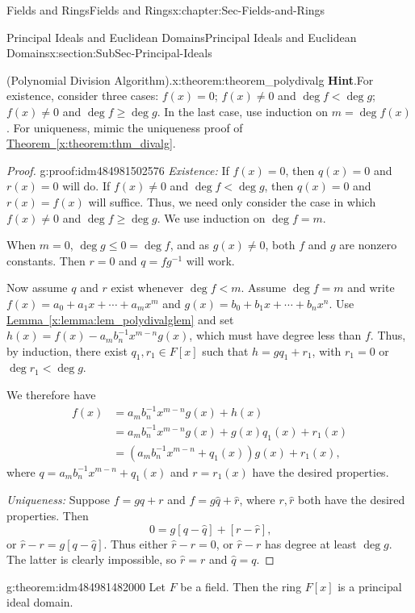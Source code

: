 \documentclass[oneside,10pt,]{book}
\newcommand{\blocktitlefont}{\relax}
\newcommand{\xreffont}{\relax}
\numberwithin{equation}{section}
\renewcommand{\le}{\leqslant}
\renewcommand{\ge}{\geqslant}
\newcommand{\lt}{<}
\newcommand{\amp}{&}
\begin{document}
\begin{chapterptx}{Fields and Rings}{}{Fields and Rings}{}{}{x:chapter:Sec-Fields-and-Rings}
\begin{sectionptx}{Principal Ideals and Euclidean Domains}{}{Principal Ideals and Euclidean Domains}{}{}{x:section:SubSec-Principal-Ideals}
\begin{theorem}{(Polynomial Division Algorithm).}{}{x:theorem:theorem_polydivalg}
\textbf{\blocktitlefont Hint}.\quad{}For existence, consider three cases: \(f(x) = 0\); \(f(x) \ne 0\) and \(\deg f \lt \deg g\); \(f(x) \ne 0\) and \(\deg f \ge \deg g\). In the last case, use induction on \(m = \deg f(x)\). For uniqueness, mimic the uniqueness proof of \hyperref[x:theorem:thm_divalg]{Theorem~{\xreffont\ref{x:theorem:thm_divalg}}}.%
\end{theorem}
\begin{proof}{}{g:proof:idm484981502576}
\emph{Existence:} If \(f(x) = 0\), then \(q(x) = 0\) and \(r(x) = 0\) will do. If \(f(x)\ne 0\) and \(\deg f \lt \deg g\), then \(q(x) = 0\) and \(r(x) = f(x)\) will suffice. Thus, we need only consider the case in which \(f(x) \ne 0\) and \(\deg f \ge \deg g\). We use induction on \(\deg f = m\).%
\par
When \(m = 0\), \(\deg g \le 0 = \deg f\), and as \(g(x) \ne 0\), both \(f\) and \(g\) are nonzero constants. Then \(r = 0\) and \(q = fg^{-1}\) will work.%
\par
Now assume \(q\) and \(r\) exist whenever \(\deg f \lt m\). Assume \(\deg f = m\) and write \(f(x) = a_0 + a_1 x + \cdots + a_m x^m\) and \(g(x) = b_0 + b_1 x + \cdots + b_n x^n\). Use \hyperref[x:lemma:lem_polydivalglem]{Lemma~{\xreffont\ref{x:lemma:lem_polydivalglem}}} and set \(h(x) = f(x) - a_m b_n^{-1} x^{m-n} g(x)\), which must have degree less than \(f\). Thus, by induction, there exist \(q_1, r_1\in F[x]\) such that \(h = g q_1 + r_1\), with \(r_1 = 0\) or \(\deg r_1 \lt \deg g\).%
\par
We therefore have%
\begin{align*}
f(x) \amp = a_m b_n^{-1} x^{m-n} g(x) + h(x)\\
\amp = a_m b_n^{-1} x^{m-n} g(x) + g(x) q_1(x) + r_1(x)\\
\amp = (a_m b_n^{-1} x^{m-n} + q_1(x)) g(x) + r_1(x)\text{,}
\end{align*}
where \(q = a_m b_n^{-1} x^{m-n} + q_1(x)\) and \(r = r_1(x)\) have the desired properties.%
\par
\emph{Uniqueness:} Suppose \(f = gq + r\) and \(f = g\hat{q} + \hat{r}\), where \(r,\hat{r}\) both have the desired properties. Then%
\begin{equation*}
0 = g[q - \hat{q}] + [r - \hat{r}]\text{,}
\end{equation*}
or \(\hat{r} - r = g [q - \hat{q}]\). Thus either \(\hat{r} - r = 0\), or \(\hat{r} - r\) has degree at least \(\deg g\). The latter is clearly impossible, so \(\hat{r} = r\) and \(\hat{q} = q\).%
\end{proof}
\begin{theorem}{}{}{g:theorem:idm484981482000}%
Let \(F\) be a field. Then the ring \(F[x]\) is a principal ideal domain.%


\end{theorem}
\end{sectionptx}
\end{chapterptx}
\end{document}
